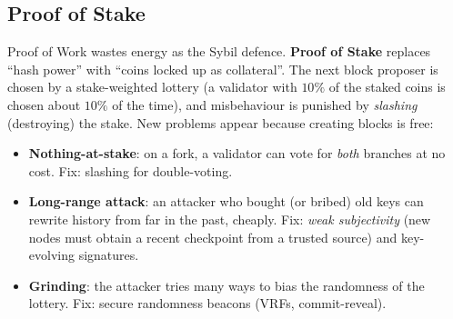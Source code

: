 \documentclass[11pt,a4paper]{article}
\newenvironment{plainenglish}{\par\smallskip}{\par\smallskip}
\theoremstyle{definition}
\theoremstyle{plain}
\theoremstyle{remark}
\begin{document}
\subsection{Proof of Stake}

\begin{plainenglish}
Proof of Work wastes energy as the Sybil defence. \textbf{Proof of Stake} replaces ``hash power'' with ``coins locked up as collateral''. The next block proposer is chosen by a stake-weighted lottery (a validator with $10\%$ of the staked coins is chosen about $10\%$ of the time), and misbehaviour is punished by
\emph{slashing} (destroying) the stake. New problems appear because creating blocks is free:
\begin{itemize}[nosep]
\item \textbf{Nothing-at-stake}: on a fork, a validator can vote for \emph{both} branches at no cost. Fix: slashing for double-voting.
\item \textbf{Long-range attack}: an attacker who bought (or bribed) old keys can rewrite history from far in the past, cheaply. Fix: \emph{weak subjectivity} (new nodes must obtain a recent checkpoint from a trusted source) and key-evolving signatures.
\item \textbf{Grinding}: the attacker tries many ways to bias the randomness of the lottery. Fix: secure randomness beacons (VRFs, commit-reveal).
\end{itemize}
\end{plainenglish}
\end{document}
